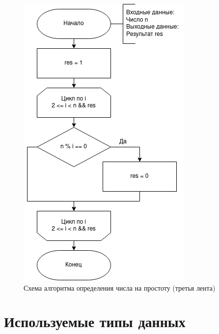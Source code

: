 \begin{figure}[H]
	\begin{center}
		\includegraphics[scale=0.6]{assets/prime.png}
	\end{center}
	\caption{Схема алгоритма определения числа на простоту (третья лента)}
\end{figure}

\newpage
\section{Используемые типы данных}

